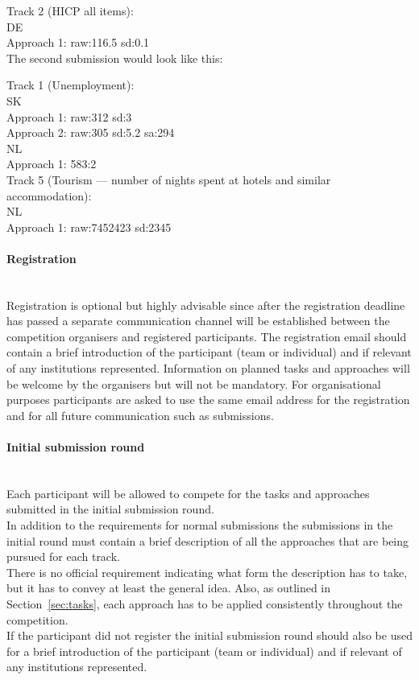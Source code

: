\documentclass[12pt]{article}
\begin{document}
Track 2 (HICP all items):\\
DE\\
Approach 1: raw:116.5 sd:0.1\\

The second submission would look like this:

Track 1 (Unemployment):\\
SK\\
Approach 1: raw:312 sd:3\\
Approach 2: raw:305 sd:5.2  sa:294\\
NL\\
Approach 1: 583:2\\
Track 5 (Tourism — number of nights spent at hotels and similar accommodation):\\
NL\\
Approach 1: raw:7452423 sd:2345\\


\paragraph{Registration}

\textbf{ }\\
Registration is optional but highly advisable since after the registration deadline has passed a separate communication channel will be established between the competition organisers and registered participants.
The registration email should contain a brief introduction of the participant (team or individual) and if relevant of any institutions represented. Information on planned tasks and approaches will be welcome by the organisers but will not be mandatory. For organisational purposes participants are asked to use the same email address for the registration and for all future communication such as submissions.

\paragraph{Initial submission round}

\textbf{ }\\
Each participant will be allowed to compete for the tasks and approaches submitted in the initial submission round. \\
In addition to the requirements for normal submissions the submissions in the initial round must contain a brief description of all the approaches that are being pursued for each track. \\
There is no official requirement indicating what form the description has to take, but it has to convey at least the general idea. Also, as outlined in Section~\ref{sec:tasks}, each approach has to be applied consistently throughout the competition. \\
If the participant did not register the initial submission round should also be used for a brief introduction of the participant (team or individual) and if relevant of any institutions represented.
\end{document}
